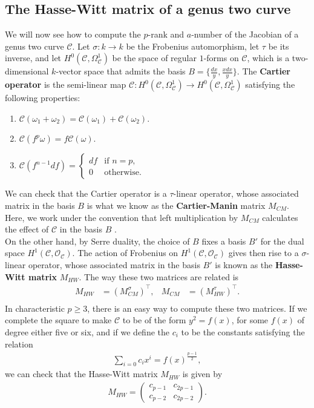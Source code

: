 \documentclass{amsart}
\newcommand{\calC}{\mathcal{C}}
\newcommand{\calO}{\mathcal{O}}
\newcommand{\CC}{\mathscr{C}}
\numberwithin{equation}{section}
\theoremstyle{definition}
\theoremstyle{remark}
\begin{document}
\subsection{The Hasse-Witt matrix of a genus two curve}
We will now see how to compute the $p$-rank and $a$-number of the Jacobian of a genus two curve $\calC$. Let $\sigma:k\rightarrow k$ be the Frobenius automorphism, let $\tau$ be its inverse, and let $H^0(\calC,\Omega^1_\calC)$ be the space of regular $1$-forms on $\calC$, which is a two-dimensional $k$-vector space that admits the basis $B=\{\frac{dx}{y},\frac{x dx}{y}\}$. The \textbf{Cartier operator} is the semi-linear map $\CC:H^0(\calC,\Omega^1_\calC)\rightarrow H^0(\calC,\Omega^1_\calC)$ satisfying the following properties:
\begin{enumerate}
    \item $\CC(\omega_1+\omega_2)=\CC(\omega_1)+\CC(\omega_2)$.
    \item $\CC(f^p\omega)=f\CC(\omega)$.
    \item $\CC(f^{n-1} df)=\begin{cases}
    df &\text{if }n=p,\\
    0 &\text{otherwise.}
    \end{cases}$\\
\end{enumerate}

We can check that the Cartier operator is a $\tau$-linear operator, whose associated matrix in the basis $B$ is what we know as the \textbf{Cartier-Manin} matrix $M_{CM}$. Here, we work under the convention that left multiplication by $M_{CM}$ calculates the effect of $\CC$ in the basis $B$ \cite{Achter2019HasseWittRequest}.\\

On the other hand, by Serre duality, the choice of $B$ fixes a basis $B'$ for the dual space $H^1(\calC,\calO_\calC)$. The action of Frobenius on $H^1(\calC,\calO_\calC)$ gives then rise to a $\sigma$-linear operator, whose associated matrix in the basis $B'$ is known as the \textbf{Hasse-Witt matrix} $M_{HW}$.
The way these two matrices are related is
\begin{align*}
M_{HW}&=(M_{CM}^\sigma)^\intercal, & M_{CM}&=(M_{HW}^\tau)^\intercal.\\
\end{align*}
In characteristic $p\geq3$, there is an easy way to compute these two matrices. If we complete the square to make $\calC$ to be of the form $y^2=f(x)$, for some $f(x)$ of degree either five or six, and if we define the $c_i$ to be the constants satisfying the relation
\begin{align*}
\sum_{i=0}c_i x^i=f(x)^{\frac{p-1}{2}},
\end{align*}
we can check that the Hasse-Witt matrix $M_{HW}$ is given by
\begin{align*}
M_{HW}=\begin{pmatrix}
c_{p-1} & c_{2p-1}\\
c_{p-2} & c_{2p-2}
\end{pmatrix}.\\
\end{align*}
\end{document}
